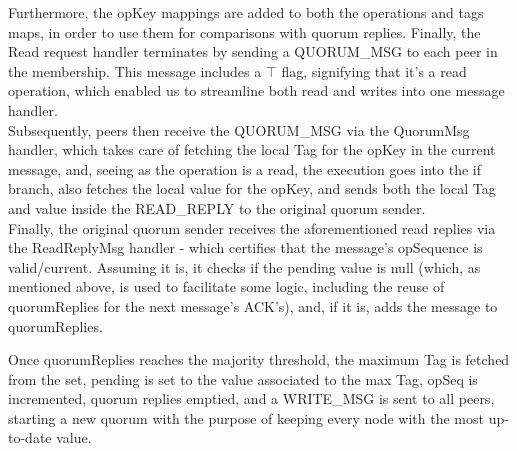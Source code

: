 \documentclass[sigconf]{acmart}
\begin{document}
Furthermore, the opKey mappings are added to both the operations and tags maps, in order to use them for comparisons with quorum replies. Finally, the Read request handler terminates by sending a QUORUM\_MSG to each peer in the membership. This message includes a $\top$ flag, signifying that it's a read operation, which enabled us to streamline both read and writes into one message handler. \\

Subsequently, peers then receive the QUORUM\_MSG via the QuorumMsg handler, which takes care of fetching the local Tag for the opKey in the current message, and, seeing as the operation is a read, the execution goes into the if branch, also fetches the local value for the opKey, and sends both the local Tag and value inside the READ\_REPLY to the original quorum sender. \\

Finally, the original quorum sender receives the aforementioned read replies via the ReadReplyMsg handler - which certifies that the message's opSequence is valid/current. Assuming it is, it checks if the pending value is null (which, as mentioned above, is used to facilitate some logic, including the reuse of quorumReplies for the next message's ACK's), and, if it is, adds the message to quorumReplies.

Once quorumReplies reaches the majority threshold, the maximum Tag is fetched from the set, pending is set to the value associated to the max Tag, opSeq is incremented, quorum replies emptied, and a WRITE\_MSG is sent to all peers, starting a new quorum with the purpose of keeping every node with the most up-to-date value.  \\
\end{document}

